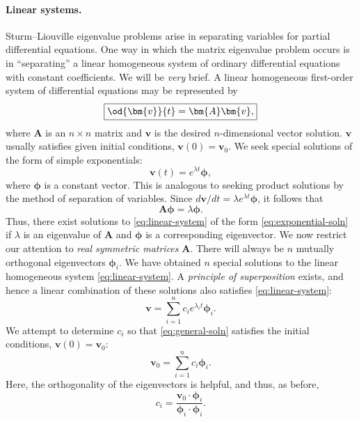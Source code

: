 \paragraph{Linear systems.}
Sturm--Liouville eigenvalue problems arise in separating variables for partial differential equations.  One way in which the matrix eigenvalue problem occurs is in ``separating'' a linear homogeneous system of ordinary differential equations with constant coefficients.  We will be \textit{very} brief.  A linear homogeneous first-order system of differential equations may be represented by
\begin{equation}
\label{eq:linear-system}
\boxed{\od{\bm{v}}{t} = \bm{A}\bm{v},}
\end{equation}
where $\bm{A}$ is an $n \times n$ matrix and $\bm{v}$ is the desired $n$-dimensional vector solution.  $\bm{v}$ usually satisfies given initial conditions, $\bm{v}(0) = \bm{v}_0$.  We seek special solutions of the form of simple exponentials:
\begin{equation}
\label{eq:exponential-soln}
\boxed{\bm{v}(t) = e^{\lambda t}\bm{\phi},}
\end{equation}
where $\bm{\phi}$ is a constant vector.  This is analogous to seeking product solutions by the method of separation of variables.  Since $d\bm{v}/dt = \lambda e^{\lambda t}\bm{\phi}$, it follows that
\begin{equation}
\label{eq:matrix-eig-system}
\bm{A}\bm{\phi} = \lambda\bm{\phi}.
\end{equation}
Thus, there exist solutions to \eqref{eq:linear-system} of the form \eqref{eq:exponential-soln} if $\lambda$ is an eigenvalue of $\bm{A}$ and $\bm{\phi}$ is a corresponding eigenvector.  We now restrict our attention to \textit{real symmetric matrices} $\bm{A}$.  There will always be $n$ mutually orthogonal eigenvectors $\bm{\phi}_i$.  We have obtained $n$ special solutions to the linear homogeneous system \eqref{eq:linear-system}.  A \textit{principle of superposition} exists, and hence a linear combination of these solutions also satisfies \eqref{eq:linear-system}:
\begin{equation}
\label{eq:general-soln}
\boxed{\bm{v} = \sum_{i=1}^{n} c_i e^{\lambda_i t}\bm{\phi}_i.}
\end{equation}
We attempt to determine $c_i$ so that \eqref{eq:general-soln} satisfies the initial conditions, $\bm{v}(0) = \bm{v}_0$:
\[
\bm{v}_0 = \sum_{i=1}^{n} c_i\bm{\phi}_i.
\]
Here, the orthogonality of the eigenvectors is helpful, and thus, as before,
\[
c_i = \frac{\bm{v}_0\cdot\bm{\phi}_i}{\bm{\phi}_i\cdot\bm{\phi}_i}.
\]


